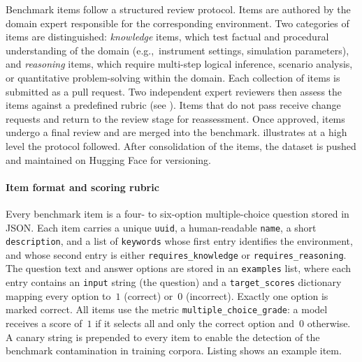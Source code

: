 Benchmark items follow a structured review protocol.
Items are authored by the domain expert responsible for the corresponding
environment.
Two categories of items are distinguished:
\emph{knowledge} items, which test factual and procedural understanding of the
domain (e.g.,\ instrument settings, simulation parameters),
and \emph{reasoning} items, which require multi-step logical inference, scenario
analysis, or quantitative problem-solving within the domain. Each collection of items is submitted as a pull request. Two independent expert reviewers then assess the items against a predefined rubric (see ). Items that do not pass receive change requests and return to the review stage for reassessment. Once approved, items undergo a final review and are merged into the benchmark.
 illustrates at a high level the protocol followed. After consolidation of the items, the dataset is pushed and maintained on Hugging Face  \autocite{lab_of_kevin_jablonka_at_uni_jena_2026_qas} for versioning.


\resizebox{\textwidth}{!}{}

\paragraph{Item format and scoring rubric}

Every benchmark item is a four- to six-option multiple-choice question stored in JSON.
Each item carries a unique \texttt{uuid}, a human-readable \texttt{name}, a short
\texttt{description}, and a list of \texttt{keywords} whose first entry
identifies the environment, and whose second entry is either
\texttt{requires\_knowledge} or \texttt{requires\_reasoning}.
The question text and answer options are stored in an \texttt{examples} list, where
each entry contains an \texttt{input} string (the question) and a
\texttt{target\_scores} dictionary mapping every option to~$1$ (correct) or~$0$
(incorrect). Exactly one option is marked correct.
All items use the metric \texttt{multiple\_choice\_grade}: a model receives a score
of~$1$ if it selects all and only the correct option and~$0$ otherwise.
A canary string is prepended to every item to enable the detection of the benchmark
contamination in training corpora.
Listing  shows an example item.

